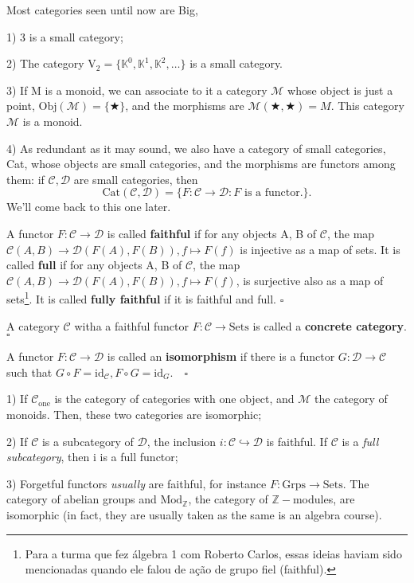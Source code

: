 \documentclass[../category_theory.tex]{subfiles}
\begin{document}
Most categories seen until now are Big,
\begin{example}
	\item[1)] 3 is a small category;
	\item[2)] The category \(\mathrm{V}_{2}=\{\mathbb{K}^{0}, \mathbb{K}^{1}, \mathbb{K}^{2},\dotsc \}\) is a small category.
	\item[3)] If M is a monoid, we can associate to it a category \(\mathcal{M}\) whose object is just a point, \(\mathrm{Obj}(\mathcal{M})=\{\bigstar\}\), and the morphisms are \(\mathcal{M}(\bigstar, \bigstar)=M\). This category \(\mathcal{M}\) is a monoid.
	\item[4)] As redundant as it may sound, we also have a category of small categories, Cat, whose objects are small categories, and the morphisms are functors among them: if \(\mathcal{C, D}\) are small categories, then
	\[
		\mathrm{Cat}(\mathcal{C}, \mathcal{D}) =\{F:\mathcal{C}\rightarrow \mathcal{D}:F \text{ is a functor.}\}.
	\]
	We'll come back to this one later.
\end{example}
\begin{def*}
	A functor \(F:\mathcal{C}\rightarrow \mathcal{D}\) is called \textbf{faithful} if for any objects A, B of \(\mathcal{C}\), the map \(\mathcal{C}(A, B)\rightarrow \mathcal{D}(F(A), F(B)), f\mapsto F(f)\) is injective as a map of sets. It is called \textbf{full} if for any objects A, B of \(\mathcal{C}\), the map \(\mathcal{C}(A, B)\rightarrow \mathcal{D}(F(A), F(B)), f \mapsto F(f)\), is surjective also as a map of sets\footnote{Para a turma que fez álgebra 1 com Roberto Carlos, essas ideias haviam sido mencionadas quando ele falou de ação de grupo fiel (faithful).}. It is called \textbf{fully faithful} if it is faithful and full. \(\square\)
\end{def*}
\begin{def*}
	A category \(\mathcal{C}\) witha a faithful functor \(F:\mathcal{C}\rightarrow \mathrm{Sets}\) is called a \textbf{concrete category}. \(\square\)
\end{def*}
\begin{def*}
	A functor \(F:\mathcal{C}\rightarrow \mathcal{D}\) is called an \textbf{isomorphism} if there is a functor \(G:\mathcal{D}\rightarrow \mathcal{C}\) such that \(G\circ F=\mathrm{id}_{\mathcal{C}}, F\circ G=\mathrm{id}_{G}.\quad \square\)
\end{def*}
\begin{example}
	\item[1)] If \(\mathcal{C}_{\text{one}}\) is the category of categories with one object, and \(\mathcal{M}\) the category of monoids. Then, these two categories are isomorphic;
	\item[2)] If \(\mathcal{C}\) is a subcategory of \(\mathcal{D}\), the inclusion \(i:\mathcal{C}\hookrightarrow \mathcal{D}\) is faithful. If \(\mathcal{C}\) is a \textit{full subcategory}, then i is a full functor;
	\item[3)] Forgetful functors \textit{usually} are faithful, for instance \(F:\mathrm{Grps}\rightarrow \mathrm{Sets}\). The category of abelian groups and \(\mathrm{Mod}_{\mathbb{Z}}\), the category of \(\mathbb{Z}-\)modules, are isomorphic (in fact, they are usually taken as the same is an algebra course).
\end{example}
\end{document}
